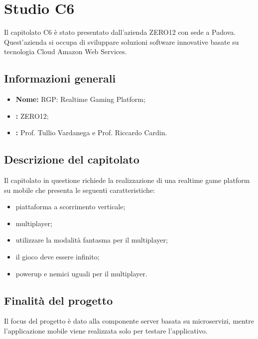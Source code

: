 \section{Studio C6}
Il capitolato C6 è stato presentato dall'azienda ZERO12 con sede a Padova. Quest'azienda si occupa di sviluppare soluzioni software
innovative basate su tecnologia Cloud Amazon Web Services.

\subsection{Informazioni generali}
\begin{itemize}
	\item \textbf{Nome:} RGP: Realtime Gaming Platform;
	\item \textbf{:} ZERO12;
	\item \textbf{:} Prof. Tullio Vardanega e Prof. Riccardo Cardin.
\end{itemize}

\subsection{Descrizione del capitolato}
Il capitolato in questione richiede la realizzazione di una realtime game platform su mobile che presenta le seguenti caratteristiche:
\begin{itemize}
	\item piattaforma a scorrimento verticale;
	\item multiplayer;
	\item utilizzare la modalità fantasma per il multiplayer;
	\item il gioco deve essere infinito;
	\item powerup e nemici uguali per il multiplayer.
\end{itemize}


\subsection{Finalità del progetto}
Il focus del progetto è dato alla componente server basata su microservizi, mentre l'applicazione mobile viene realizzata solo per testare l'applicativo.

